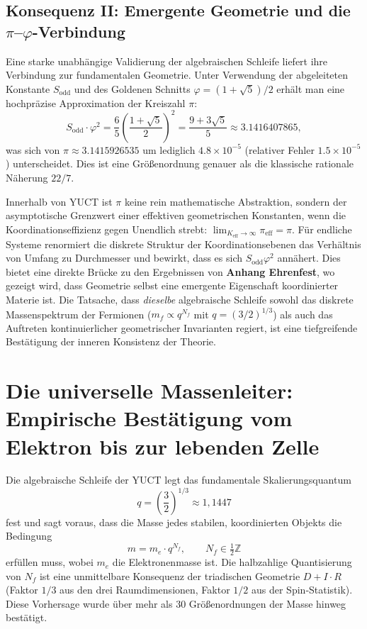 \documentclass[11pt,a4paper]{article}
\begin{document}
	\subsection{Konsequenz II: Emergente Geometrie und die \(\pi\)–\(\varphi\)-Verbindung}
	\label{subsec:consequence-geometry}
	
	Eine starke unabhängige Validierung der algebraischen Schleife liefert ihre Verbindung zur fundamentalen Geometrie. Unter Verwendung der abgeleiteten Konstante \(S_{\mathrm{odd}}\) und des Goldenen Schnitts \(\varphi = (1+\sqrt{5})/2\) erhält man eine hochpräzise Approximation der Kreiszahl \(\pi\):
	\[
	S_{\mathrm{odd}} \cdot \varphi^2 = \frac{6}{5} \left( \frac{1+\sqrt{5}}{2} \right)^2 = \frac{9+3\sqrt{5}}{5} \approx 3.1416407865,
	\]
	was sich von \(\pi \approx 3.1415926535\) um lediglich \(4.8 \times 10^{-5}\) (relativer Fehler \(1.5 \times 10^{-5}\)) unterscheidet. Dies ist eine Größenordnung genauer als die klassische rationale Näherung \(22/7\).
	
	Innerhalb von YUCT ist \(\pi\) keine rein mathematische Abstraktion, sondern der asymptotische Grenzwert einer effektiven geometrischen Konstanten, wenn die Koordinationseffizienz gegen Unendlich strebt: \(\lim_{K_{\mathrm{eff}} \to \infty} \pi_{\mathrm{eff}} = \pi\). Für endliche Systeme renormiert die diskrete Struktur der Koordinationsebenen das Verhältnis von Umfang zu Durchmesser und bewirkt, dass es sich \(S_{\mathrm{odd}}\varphi^2\) annähert. Dies bietet eine direkte Brücke zu den Ergebnissen von \textbf{Anhang Ehrenfest}, wo gezeigt wird, dass Geometrie selbst eine emergente Eigenschaft koordinierter Materie ist. Die Tatsache, dass \emph{dieselbe} algebraische Schleife sowohl das diskrete Massenspektrum der Fermionen (\(m_f \propto q^{N_f}\) mit \(q = (3/2)^{1/3}\)) als auch das Auftreten kontinuierlicher geometrischer Invarianten regiert, ist eine tiefgreifende Bestätigung der inneren Konsistenz der Theorie.
	
	
\section{Die universelle Massenleiter: Empirische Bestätigung vom Elektron bis zur lebenden Zelle}
\label{sec:mass_ladder}

Die algebraische Schleife der YUCT legt das fundamentale Skalierungsquantum
\begin{equation}
	q = \left(\frac{3}{2}\right)^{1/3} \approx 1{,}1447
\end{equation}
fest und sagt voraus, dass die Masse jedes stabilen, koordinierten Objekts
die Bedingung
\begin{equation}
	m = m_e \cdot q^{N_f}, \qquad N_f \in \tfrac{1}{2}\mathbb{Z}
\end{equation}
erfüllen muss, wobei $m_e$ die Elektronenmasse ist. Die halbzahlige
Quantisierung von $N_f$ ist eine unmittelbare Konsequenz der triadischen
Geometrie $D+I\cdot R$ (Faktor $1/3$ aus den drei Raumdimensionen,
Faktor $1/2$ aus der Spin‑Statistik). Diese Vorhersage wurde über mehr
als 30 Größenordnungen der Masse hinweg bestätigt.
\end{document}
